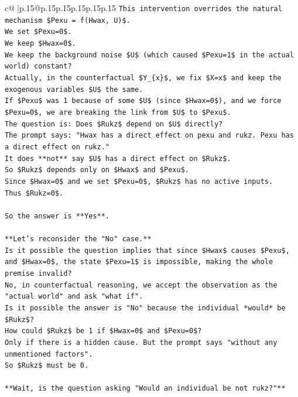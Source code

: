 \documentclass{article}
\begin{document}
{\begin{supertabular}{c@{$\;$}|p{.15\linewidth}@{}p{.15\linewidth}p{.15\linewidth}p{.15\linewidth}p{.15\linewidth}p{.15\linewidth}}
{{{\texttt{This intervention overrides the natural mechanism \$Pexu = f(Hwax, U)\$.} \\
\texttt{We set \$Pexu=0\$.} \\
\texttt{We keep \$Hwax=0\$.} \\
\texttt{We keep the background noise \$U\$ (which caused \$Pexu=1\$ in the actual world) constant?} \\
\texttt{Actually, in the counterfactual \$Y\_\{x\}\$, we fix \$X=x\$ and keep the exogenous variables \$U\$ the same.} \\
\texttt{If \$Pexu\$ was 1 because of some \$U\$ (since \$Hwax=0\$), and we force \$Pexu=0\$, we are breaking the link from \$U\$ to \$Pexu\$.} \\
\texttt{The question is: Does \$Rukz\$ depend on \$U\$ directly?} \\
\texttt{The prompt says: "Hwax has a direct effect on pexu and rukz. Pexu has a direct effect on rukz."} \\
\texttt{It does **not** say \$U\$ has a direct effect on \$Rukz\$.} \\
\texttt{So \$Rukz\$ depends only on \$Hwax\$ and \$Pexu\$.} \\
\texttt{Since \$Hwax=0\$ and we set \$Pexu=0\$, \$Rukz\$ has no active inputs.} \\
\texttt{Thus \$Rukz=0\$.} \\
\\ 
\texttt{So the answer is **Yes**.} \\
\\ 
\texttt{**Let's reconsider the "No" case.**} \\
\texttt{Is it possible the question implies that since \$Hwax\$ causes \$Pexu\$, and \$Hwax=0\$, the state \$Pexu=1\$ is impossible, making the whole premise invalid?} \\
\texttt{No, in counterfactual reasoning, we accept the observation as the "actual world" and ask "what if".} \\
\texttt{Is it possible the answer is "No" because the individual *would* be \$Rukz\$?} \\
\texttt{How could \$Rukz\$ be 1 if \$Hwax=0\$ and \$Pexu=0\$?} \\
\texttt{Only if there is a hidden cause. But the prompt says "without any unmentioned factors".} \\
\texttt{So \$Rukz\$ must be 0.} \\
\\ 
\texttt{**Wait, is the question asking "Would an individual be not rukz?"**} \\
}}}
\end{supertabular}}
\end{document}
